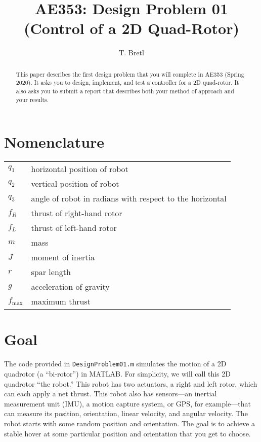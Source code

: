 \documentclass[conf]{new-aiaa}
\title{AE353: Design Problem 01\\ (Control of a 2D Quad-Rotor)}
\author{T. Bretl}
\begin{document}
\maketitle

\begin{abstract}
This paper describes the first design problem that you will complete in AE353 (Spring 2020). It asks you to design, implement, and test a controller for a 2D quad-rotor. It also asks you to submit a report that describes both your method of approach and your results.
\end{abstract}


\section{Nomenclature}

{\renewcommand\arraystretch{1.0}
\noindent\begin{longtable*}{@{}l @{\quad=\quad} l@{}}
$q_{1}$ & horizontal position of robot \\
$q_{2}$ & vertical position of robot \\
$q_{3}$ & angle of robot in radians with respect to the horizontal \\
$f_{R}$ & thrust of right-hand rotor \\
$f_{L}$ & thrust of left-hand rotor \\
$m$ & mass \\
$J$ & moment of inertia \\
$r$ & spar length \\
$g$ & acceleration of gravity \\
$f_{\text{max}}$ & maximum thrust
\end{longtable*}}


\section{Goal}

The code provided in \lstinline!DesignProblem01.m! simulates the motion of a 2D quadrotor (a ``bi-rotor'') in MATLAB. For simplicity, we will call this 2D quadrotor ``the robot.'' This robot has two actuators, a right and left rotor, which can each apply a net thrust. This robot also has sensors---an inertial measurement unit (IMU), a motion capture system, or GPS, for example---that can measure its position, orientation, linear velocity, and angular velocity. The robot starts with some random position and orientation. The goal is to achieve a stable hover at some particular position and orientation that you get to choose.
\end{document}
